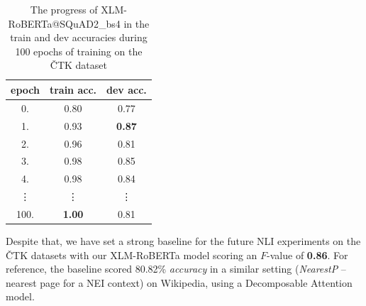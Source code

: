 \begin{table}[H]
\begin{ctucolortab}
\begin{tabular}{|c|c|c|}
\hline
\textbf{epoch} & \textbf{\textsf{train} acc. }   &\textbf{ \textsf{dev} acc.}    \\
\hline
0.     & 0.80 & 0.77  \\
1.     & 0.93 & \textbf{0.87}  \\
2.     & 0.96 & 0.81  \\
3.     & 0.98 & 0.85 \\
4.     & 0.98 & 0.84 \\
 \vdots      & \vdots   &  \vdots \\
100.   & \textbf{1.00}  & 0.81 \\  
\hline
\end{tabular}
\end{ctucolortab}
\caption{The progress of \textsf{XLM-RoBERTa@SQuAD2\_bs4} in the \textsf{train} and \textsf{dev} accuracies during 100 epochs of training on the \textsf{ČTK} dataset}
    \label{tab:overfitting}
\end{table} %

Despite that, we have set a strong baseline for the future NLI experiments on the \textsf{ČTK} datasets with our \textsf{XLM-RoBERTa} model scoring an $F$-value of \textbf{0.86}. For reference, the \cite{fever} baseline scored 80.82\% \textit{accuracy} in a similar setting (\textit{NearestP} -- nearest page for a \textsf{NEI} context) on \textsf{Wikipedia}, using a Decomposable Attention model.

